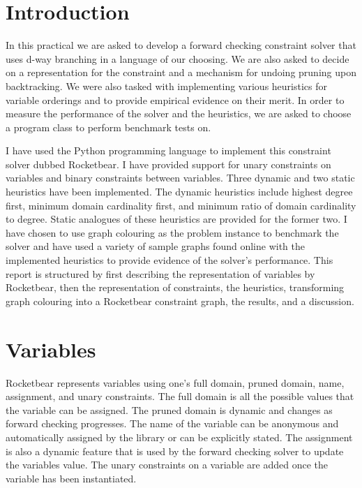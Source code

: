 \documentclass{article}
\begin{document}
\maketitle

\section{Introduction}

In this practical we are asked to develop a forward checking constraint solver
that uses d-way branching in a language of our choosing. We are also asked to
decide on a representation for the constraint and a mechanism for undoing
pruning upon backtracking. We were also tasked with implementing various
heuristics for variable orderings and to provide empirical evidence on their
merit. In order to measure the performance of the solver and the heuristics, we
are asked to choose a program class to perform benchmark tests on.

I have used the Python programming language to implement this constraint solver
dubbed Rocketbear. I have provided support for unary constraints on variables
and binary constraints between variables. Three dynamic and two static
heuristics have been implemented. The dynamic heuristics include highest degree
first, minimum domain cardinality first, and minimum ratio of domain
cardinality to degree.  Static analogues of these heuristics are provided for
the former two.  I have chosen to use graph colouring as the problem instance
to benchmark the solver and have used a variety of sample graphs found online
with the implemented heuristics to provide evidence of the solver's
performance. This report is structured by first describing the representation
of variables by Rocketbear, then the representation of constraints, the
heuristics, transforming graph colouring into a Rocketbear constraint graph,
the results, and a discussion.

\section{Variables}

Rocketbear represents variables using one's full domain, pruned domain, name,
assignment, and unary constraints. The full domain is all the possible values
that the variable can be assigned. The pruned domain is dynamic and changes as
forward checking progresses. The name of the variable can be anonymous and
automatically assigned by the library or can be explicitly stated. The
assignment is also a dynamic feature that is used by the forward checking
solver to update the variables value. The unary constraints on a variable are
added once the variable has been instantiated.
\end{document}
